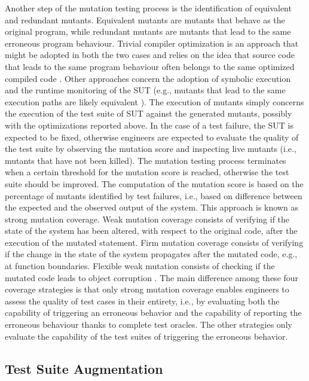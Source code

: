 Another step of the mutation testing process is the identification of equivalent and redundant mutants. Equivalent mutants are mutants that behave as the original program, while redundant mutants are mutants that lead to the same erroneous program behaviour. Trivial compiler optimization is an approach that might be adopted in both the two cases and relies on the idea that source code that leads to the same program behaviour often belongs to the same optimized compiled code \cite{papadakis2015trivial}. Other approaches concern the adoption of symbolic execution \cite{papadakis2012mutation,kurtz2015static} and the runtime monitoring of the SUT (e.g., mutants that lead to the same execution paths are likely equivalent \cite{schuler2013covering}).
The execution of mutants simply concerns the execution of the test suite of SUT against the generated mutants, possibly with the optimizations reported above. In the case of a test failure, the SUT is expected to be fixed, otherwise engineers are expected to evaluate the quality of the test suite by observing the mutation score and inspecting live mutants (i.e., mutants that have not been killed). The mutation testing process terminates when a certain threshold for the mutation score is reached, otherwise the test suite should be improved. The computation of the mutation score is based on the percentage of mutants identified by test failures, i.e., based on difference between the expected and the observed output of the system. This approach is known as strong mutation coverage. Weak mutation coverage consists of verifying if the state of the system has been altered, with respect to the original code, after the execution of the mutated statement. Firm mutation coverage consists of verifying if the change in the state of the system propagates after the mutated code, e.g., at function boundaries. Flexible weak mutation consists of checking if the mutated code leads to object corruption \cite{mateo2012validating}. The main difference among these four coverage strategies is that only strong mutation coverage enables engineers to assess the quality of test cases in their entirety, i.e., by evaluating both the capability of triggering an erroneous behavior and the capability of reporting the erroneous behaviour thanks to complete test oracles. The other strategies only evaluate the capability of the test suites of triggering the erroneous behavior. 


\subsection{Test Suite Augmentation} %
\label{sub:test_suite_augmentation}

